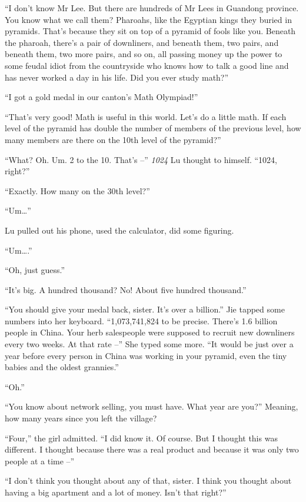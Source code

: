 ``I don't know Mr Lee. But there are hundreds of Mr Lees in Guandong
province. You know what we call them? Pharoahs, like the Egyptian
kings they buried in pyramids. That's because they sit on top of a
pyramid of fools like you. Beneath the pharoah, there's a pair of
downliners, and beneath them, two pairs, and beneath them, two more
pairs, and so on, all passing money up the power to some feudal
idiot from the countryside who knows how to talk a good line and
has never worked a day in his life. Did you ever study math?''

``I got a gold medal in our canton's Math Olympiad!''

``That's very good! Math is useful in this world. Let's do a little
math. If each level of the pyramid has double the number of members
of the previous level, how many members are there on the 10th level
of the pyramid?''

``What? Oh. Um. 2 to the 10. That's --'' \emph{1024} Lu thought to
himself. ``1024, right?''

``Exactly. How many on the 30th level?''

``Um\ldots{}''

Lu pulled out his phone, used the calculator, did some figuring.

``Um\ldots{}.''

``Oh, just guess.''

``It's big. A hundred thousand? No! About five hundred thousand.''

``You should give your medal back, sister. It's over a billion.'' Jie
tapped some numbers into her keyboard. ``1,073,741,824 to be
precise. There's 1.6 billion people in China. Your herb salespeople
were supposed to recruit new downliners every two weeks. At that
rate --'' She typed some more. ``It would be just over a year before
every person in China was working in your pyramid, even the tiny
babies and the oldest grannies.''

``Oh.''

``You know about network selling, you must have. What year are you?''
Meaning, how many years since you left the village?

``Four,'' the girl admitted. ``I did know it. Of course. But I thought
this was different. I thought because there was a real product and
because it was only two people at a time --''

``I don't think you thought about any of that, sister. I think you
thought about having a big apartment and a lot of money. Isn't that
right?''

